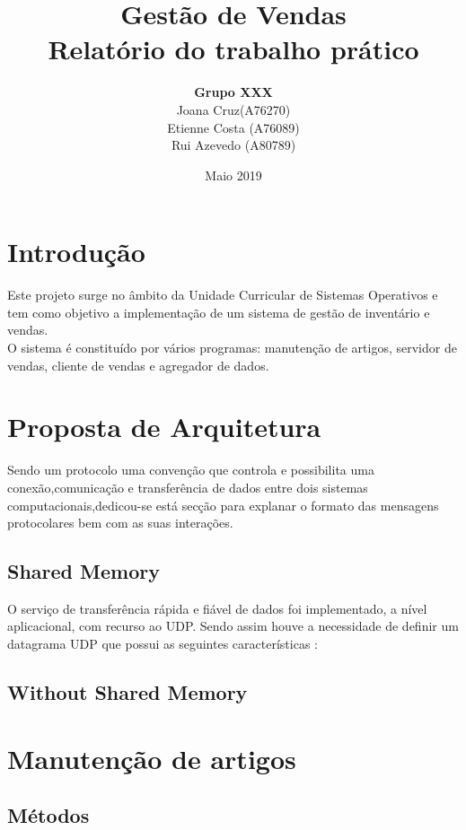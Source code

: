 \documentclass{article}
\title{
       \vspace{60px}
       \Huge \textbf{Gestão de Vendas} \\[15px]
       \Large \textbf{Relatório do trabalho prático}
      }
\author{
        \begin{tabular}{c}
            \textbf{Grupo XXX} \\[5px]
                Joana Cruz(A76270) \\
                Etienne Costa (A76089) \\
                Rui Azevedo (A80789)
        \end{tabular}
       }
\date{Maio 2019}
\begin{document}
\maketitle

\newpage
\section{Introdução}

Este projeto surge no âmbito da Unidade Curricular de Sistemas Operativos e tem como objetivo a implementação de  um sistema  de gestão de inventário e vendas.\\
O sistema é constituído por vários programas: manutenção de artigos, servidor de vendas, cliente de vendas e agregador
de dados.


\section{Proposta de Arquitetura}

Sendo um protocolo uma convenção que controla e possibilita uma conexão,comunicação e transferência de dados entre dois sistemas computacionais,dedicou-se está secção para explanar o formato das mensagens protocolares bem com as suas interações.

\subsection{Shared Memory}

O serviço de transferência rápida e fiável de dados foi implementado, a nível aplicacional, com recurso ao UDP. Sendo assim houve a necessidade de definir um datagrama UDP  que possui as seguintes características :

\subsection{Without Shared Memory}


\newpage
\section{Manutenção de artigos}
\subsection{Métodos}
\end{document}
